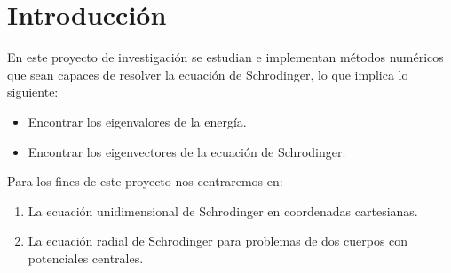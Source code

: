 \section{Introducción}

\begin{frame}{}
    \begin{tcolorbox}[colback=blue!5!white, colframe =blue!75!black, title=Introducción]
        
        En este proyecto de investigación se estudian e implementan métodos numéricos que sean capaces de resolver la ecuación de Schrodinger, lo que implica lo siguiente:

        \begin{itemize}
            \item Encontrar los eigenvalores de la energía.
            \item Encontrar los eigenvectores de la ecuación de Schrodinger.
        \end{itemize}

        Para los fines de este proyecto nos centraremos en:

        \begin{enumerate}
            \item La ecuación unidimensional de Schrodinger en coordenadas cartesianas.
            \item La ecuación radial de Schrodinger para problemas de dos cuerpos con potenciales centrales.
        \end{enumerate}

    \end{tcolorbox}
\end{frame}
